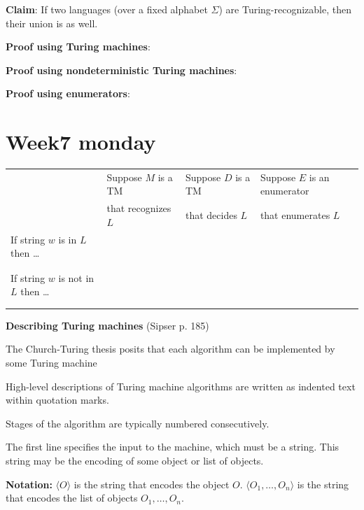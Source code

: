 \documentclass[12pt, oneside]{article}
\begin{document}
\vfill

\newpage

{\bf Claim}: If two languages  (over a fixed alphabet  $\Sigma$) are Turing-recognizable, then  their union  is  as well.

{\bf Proof using Turing machines}:

\vfill

{\bf Proof using nondeterministic Turing machines}: 

\vfill  

{\bf  Proof using enumerators}:

\vfill

 \vfill
\section*{Week7 monday}



\begin{center}
    \begin{tabular}{|l|l|l|l|}
    \hline
    & Suppose $M$ is  a TM & Suppose $D$ is  a TM & Suppose $E$ is  an
    enumerator  \\
    &that  recognizes $L$  &that  decides $L$  &that enumerates $L$ \\
    \hline
    If string $w$ is in  $L$ then  \ldots  &&& \\
    &&&\\
    &&&\\
    If string $w$ is not in  $L$ then  \ldots  && &\\
    &&&\\
    &&&\\
    \hline
    \end{tabular}
\end{center}
    
    {\bf Describing  Turing machines} (Sipser p. 185)
    
    The Church-Turing thesis posits that each algorithm can be implemented by some Turing machine

    High-level descriptions of  Turing machine algorithms are written as indented text within quotation marks.   

    Stages of the algorithm are typically numbered consecutively.

    The first line specifies the input to the machine, which must be a string.
    This string may be the encoding of some object or  list of  objects.  
    
    {\bf Notation:} $\langle O \rangle$ is the string that encodes the object $O$.
    $\langle O_1, \ldots, O_n \rangle$ is the string that encodes the list of objects $O_1, \ldots, O_n$.
    
\end{document}
